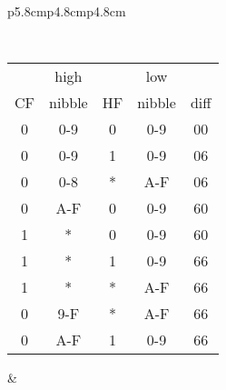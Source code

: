 {\begin{tabular}{p{5.8cm}p{4.8cm}p{4.8cm}}
        {\tt
            \begin{tabular}[t]{c|c|c|c|c}
                   &  high   &    & low    &  \\
                CF &  nibble & HF & nibble & diff \\
                \hline
                0 & 0-9     &  0 & 0-9    &  00  \\
                0 & 0-9     &  1 & 0-9    &  06  \\
                0 & 0-8     &  * & A-F    &  06  \\
                0 & A-F     &  0 & 0-9    &  60  \\
                1 &  *      &  0 & 0-9    &  60  \\
                1 &  *      &  1 & 0-9    &  66  \\
                1 &  *      &  * & A-F    &  66  \\
                0 & 9-F     &  * & A-F    &  66  \\
                0 & A-F     &  1 & 0-9    &  66  \\
                \hline
            \end{tabular}
        }

        &


\end{tabular}}
